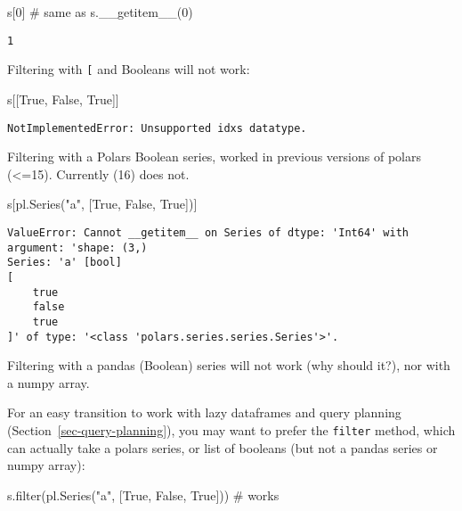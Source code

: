 \documentclass[
  letterpaper,
  DIV=11,
  numbers=noendperiod]{scrartcl}
\newenvironment{Shaded}{\begin{snugshade}}{\end{snugshade}}
\newcommand{\BuiltInTok}[1]{\textcolor[rgb]{0.00,0.23,0.31}{#1}}
\newcommand{\CommentTok}[1]{\textcolor[rgb]{0.37,0.37,0.37}{#1}}
\newcommand{\DecValTok}[1]{\textcolor[rgb]{0.68,0.00,0.00}{#1}}
\newcommand{\NormalTok}[1]{\textcolor[rgb]{0.00,0.23,0.31}{#1}}
\newcommand{\StringTok}[1]{\textcolor[rgb]{0.13,0.47,0.30}{#1}}
\newcommand{\VariableTok}[1]{\textcolor[rgb]{0.07,0.07,0.07}{#1}}
\begin{document}
\begin{Shaded}
\begin{Highlighting}[]
\NormalTok{s[}\DecValTok{0}\NormalTok{] }\CommentTok{\# same as s.\_\_getitem\_\_(0)}
\end{Highlighting}
\end{Shaded}

\begin{verbatim}
1
\end{verbatim}

Filtering with \texttt{{[}} and Booleans will not work:

\begin{Shaded}
\begin{Highlighting}[]
\NormalTok{s[[}\VariableTok{True}\NormalTok{, }\VariableTok{False}\NormalTok{, }\VariableTok{True}\NormalTok{]]}
\end{Highlighting}
\end{Shaded}

\begin{verbatim}
NotImplementedError: Unsupported idxs datatype.
\end{verbatim}

Filtering with a Polars Boolean series, worked in previous versions of
polars (\textless=15). Currently (16) does not.

\begin{Shaded}
\begin{Highlighting}[]
\NormalTok{s[pl.Series(}\StringTok{"a"}\NormalTok{, [}\VariableTok{True}\NormalTok{, }\VariableTok{False}\NormalTok{, }\VariableTok{True}\NormalTok{])]}
\end{Highlighting}
\end{Shaded}

\begin{verbatim}
ValueError: Cannot __getitem__ on Series of dtype: 'Int64' with argument: 'shape: (3,)
Series: 'a' [bool]
[
    true
    false
    true
]' of type: '<class 'polars.series.series.Series'>'.
\end{verbatim}

Filtering with a pandas (Boolean) series will not work (why should it?),
nor with a numpy array.

For an easy transition to work with lazy dataframes and query planning
(Section~\ref{sec-query-planning}), you may want to prefer the
\texttt{filter} method, which can actually take a polars series, or list
of booleans (but not a pandas series or numpy array):

\begin{Shaded}
\begin{Highlighting}[]
\NormalTok{s.}\BuiltInTok{filter}\NormalTok{(pl.Series(}\StringTok{"a"}\NormalTok{, [}\VariableTok{True}\NormalTok{, }\VariableTok{False}\NormalTok{, }\VariableTok{True}\NormalTok{])) }\CommentTok{\# works}
\end{Highlighting}
\end{Shaded}
\end{document}
